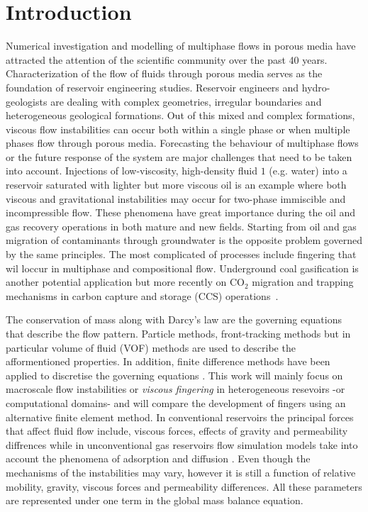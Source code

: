 \documentclass[preprint,authoryear,12pt]{elsarticle}
\begin{document}
\section{Introduction}\label{section:Intro}
\medskip
Numerical investigation and modelling of multiphase flows in porous media have attracted the attention of the scientific community over the past 40 years. Characterization of the flow of fluids through porous media serves as the foundation of reservoir engineering studies. Reservoir engineers and hydro-geologists are dealing with complex geometries, irregular boundaries and heterogeneous geological formations. Out of this mixed and complex formations, viscous flow instabilities can occur both within a single phase or when multiple phases flow through porous media. Forecasting the behaviour of multiphase flows or the future response of the system are major challenges that need to be taken into account. Injections of low-viscosity, high-density fluid $1$ (e.g. water) into a reservoir saturated with lighter but more viscous oil is an example where both viscous and gravitational instabilities may occur for two-phase immiscible and incompressible flow. These phenomena have great importance during the oil and gas recovery operations in both mature and new fields. Starting from oil and gas migration of contaminants through groundwater is the opposite problem governed by the same principles. The most complicated of processes include fingering that wil loccur in multiphase and compositional flow. Underground coal gasification is another potential application but more recently on CO$_{\text{2}}$ migration and trapping mechanisms in carbon capture and storage (CCS) operations~\citep{spycher_2003, chen_2006, self_2012, pruess_1990c, white_1981,jiang_2011}.

\medskip
The conservation of mass along with Darcy's law are the governing equations that describe the flow pattern. Particle methods, front-tracking methods \citep{univerdi_1992} but in particular volume of fluid (VOF) methods \citep{hirt_1981,rider_1998} are used to describe the afformentioned properties. In addition, finite difference methods have been applied to discretise the governing equations \citep{Luo2016,Moortgat2016,Hoteit2008}. This work will mainly focus on macroscale flow instabilities or \textit{viscous fingering} in heterogeneous resevoirs -or computational domains- and will compare the development of fingers using an alternative finite element method. 
In conventional reservoirs the principal forces that affect fluid flow include, viscous forces, effects of gravity and permeability diffrences while in unconventional gas reservoirs flow simulation models take into account the phenomena of adsorption and diffusion \citep{abdus_2015}. Even though the mechanisms of the instabilities may vary, however it is still a function of relative mobility, gravity, viscous forces and permeability differences. All these parameters are represented under one term in the global mass balance equation.   
\end{document}
